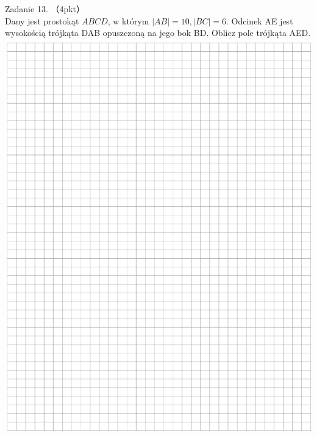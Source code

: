 \documentclass[10pt]{article}
\begin{document}
Zadanie 13. （4pkt）\\
Dany jest prostokąt \(A B C D\), w którym \(|A B|=10,|B C|=6\). Odcinek AE jest wysokością trójkąta DAB opuszczoną na jego bok BD. Oblicz pole trójkąta AED.\\
\includegraphics[max width=\textwidth, center]{2024_11_21_439e1d90cd1e7f928ae2g-11}
\end{document}
